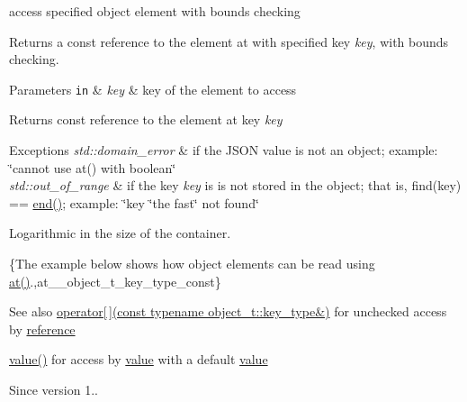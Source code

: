 access specified object element with bounds checking 

Returns a const reference to the element at with specified key {\itshape key}, with bounds checking.


\begin{DoxyParams}[1]{Parameters}
\mbox{\tt in}  & {\em key} & key of the element to access\\
\hline
\end{DoxyParams}
\begin{DoxyReturn}{Returns}
const reference to the element at key {\itshape key} 
\end{DoxyReturn}

\begin{DoxyExceptions}{Exceptions}
{\em std\+::domain\+\_\+error} & if the J\+S\+ON value is not an object; example\+: {\ttfamily \char`\"{}cannot use at() with boolean\char`\"{}} \\
\hline
{\em std\+::out\+\_\+of\+\_\+range} & if the key {\itshape key} is is not stored in the object; that is, {\ttfamily find(key) == \hyperlink{classnlohmann_1_1basic__json_a12ccf14d39ddae52f6c7e126105a230b}{end()}}; example\+: {\ttfamily \char`\"{}key \char`\"{}the fast\char`\"{} not found\char`\"{}}\\
\hline
\end{DoxyExceptions}
Logarithmic in the size of the container.

\{The example below shows how object elements can be read using {\ttfamily \hyperlink{classnlohmann_1_1basic__json_a214a8c22d616fd3567b88932c07436c9}{at()}}.,at\+\_\+\+\_\+object\+\_\+t\+\_\+key\+\_\+type\+\_\+const\}

\begin{DoxySeeAlso}{See also}
\hyperlink{classnlohmann_1_1basic__json_a92fbb711a36b5ce78ee228b26787c034}{operator\mbox{[}$\,$\mbox{]}(const typename object\+\_\+t\+::key\+\_\+type\&)} for unchecked access by \hyperlink{classnlohmann_1_1basic__json_a3ec8e17be8732fe436e9d6733f52b7a3}{reference} 

\hyperlink{classnlohmann_1_1basic__json_a407e73a037e6e3067ef7aa2c25a79f39}{value()} for access by \hyperlink{classnlohmann_1_1basic__json_a407e73a037e6e3067ef7aa2c25a79f39}{value} with a default \hyperlink{classnlohmann_1_1basic__json_a407e73a037e6e3067ef7aa2c25a79f39}{value}
\end{DoxySeeAlso}
\begin{DoxySince}{Since}
version 1.. 
\end{DoxySince}
\hypertarget{classnlohmann_1_1basic__json_a649aef71e5d952499da7ad3b8e7c9236}{}\label{classnlohmann_1_1basic__json_a649aef71e5d952499da7ad3b8e7c9236} 
